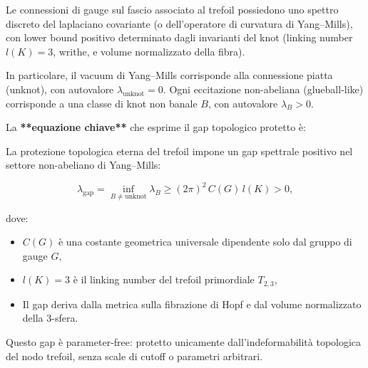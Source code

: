 \documentclass[11pt,a4paper]{article}
\theoremstyle{plain}
\theoremstyle{definition}
\begin{document}
\vspace{0.2cm}


Le connessioni di gauge sul fascio associato al trefoil possiedono uno spettro discreto del laplaciano covariante (o dell'operatore di curvatura di Yang--Mills), con lower bound positivo determinato dagli invarianti del knot (linking number \(l(K) = 3\), writhe, e volume normalizzato della fibra).

\vspace{0.2cm}

In particolare, il vacuum di Yang--Mills corrisponde alla connessione piatta (unknot), con autovalore \(\lambda_{\text{unknot}} = 0\). Ogni eccitazione non-abeliana (glueball-like) corrisponde a una classe di knot non banale \(B\), con autovalore \(\lambda_B > 0\).

\vspace{0.5cm}

La \textbf{**equazione chiave**} che esprime il gap topologico protetto è:

\vspace{0.3cm}

\begin{tcolorbox}[colback=blue!5!white, 
                  colframe=blue!75!black, 
                  title={Equazione chiave: Gap topologico mediato dal trefoil primordiale}, 
                  sharp corners, 
                  boxrule=1.5pt,
                  fonttitle=\bfseries,
                  coltitle=white]
La protezione topologica eterna del trefoil impone un gap spettrale positivo nel settore non-abeliano di Yang--Mills:

\begin{equation}
\lambda_{\text{gap}} = \inf_{B \neq \text{unknot}} \lambda_B \geq (2\pi)^2 \, C(G) \, l(K) > 0,
\label{eq:trefoil_gap}
\end{equation}

dove:
\begin{itemize}
    \item \(C(G)\) è una costante geometrica universale dipendente solo dal gruppo di gauge \(G\),
    \item \(l(K) = 3\) è il linking number del trefoil primordiale \(T_{2,3}\),
    \item Il gap deriva dalla metrica sulla fibrazione di Hopf e dal volume normalizzato della 3-sfera.
\end{itemize}

Questo gap è parameter-free: protetto unicamente dall'indeformabilità topologica del nodo trefoil, senza scale di cutoff o parametri arbitrari.
\end{tcolorbox}
\end{document}
